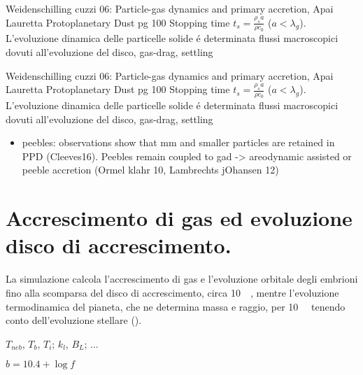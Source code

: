 \begin{workout}
	Weidenschilling cuzzi 06: Particle-gas dynamics and primary accretion, Apai Lauretta Protoplanetary Dust pg 100
	Stopping time $t_s=\frac{\rho_sa}{\rho c_0}$ ($a<\lambda_g$). L'evoluzione dinamica delle particelle solide \'e determinata flussi macroscopici dovuti all'evoluzione del disco, gas-drag, settling
\end{workout}

\begin{workout}
	Weidenschilling cuzzi 06: Particle-gas dynamics and primary accretion, Apai Lauretta Protoplanetary Dust pg 100
	Stopping time $t_s=\frac{\rho_sa}{\rho c_0}$ ($a<\lambda_g$). L'evoluzione dinamica delle particelle solide \'e determinata flussi macroscopici dovuti all'evoluzione del disco, gas-drag, settling
\end{workout}

\begin{workout}
	\begin{itemize}
		\item peebles: observations show that mm and smaller particles are retained in PPD (Cleeves16). Peebles remain coupled to gad -> areodynamic assisted or peeble accretion (Ormel klahr 10, Lambrechts jOhansen 12)
	\end{itemize}
\end{workout}

{\let\clearpage\relax\let\cleardoublepage\relax
\chapter{Accrescimento di gas ed evoluzione disco di accrescimento.}\label{chap:gasaccretion}
}%

La simulazione calcola l'accrescimento di gas e l'evoluzione orbitale degli embrioni fino alla scomparsa del disco di accrescimento, circa \SI{10}{\mega\year}, mentre l'evoluzione termodinamica del pianeta, che ne determina massa e raggio, per \SI{10}{\giga\year} tenendo conto dell'evoluzione stellare (\cite{dell2012pisa}).

\begin{workout}
$T_{neb}$, $T_b$, $T_i$; $k_l$, $B_L$; ...
\end{workout}
\begin{workout}
	$b=10.4+\log{f}$
\end{workout}

